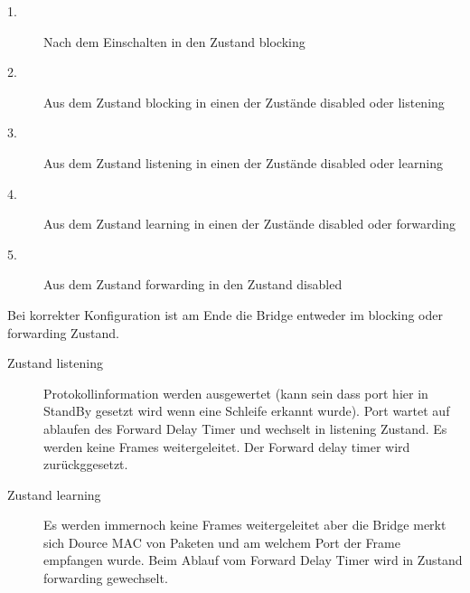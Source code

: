 \documentclass[a4paper,10pt]{scrartcl}
\begin{document}
            \begin{description}
                \item[1.] Nach dem Einschalten in den Zustand blocking
                \item[2.] Aus dem Zustand blocking in einen der Zustände disabled oder listening
                \item[3.] Aus dem Zustand listening in einen der Zustände disabled oder learning
                \item[4.] Aus dem Zustand learning in einen der Zustände disabled oder forwarding
                \item[5.] Aus dem Zustand forwarding in den Zustand disabled
            \end{description} 
            Bei korrekter Konfiguration ist am Ende die Bridge entweder im blocking oder forwarding Zustand.

            \begin{description}
                \item[Zustand listening]
                Protokollinformation werden ausgewertet (kann sein dass port hier in StandBy gesetzt wird wenn eine Schleife erkannt wurde).
                Port wartet auf ablaufen des Forward Delay Timer und wechselt in listening Zustand. Es werden keine Frames weitergeleitet.
                Der Forward delay timer wird zurückggesetzt.
                \item[Zustand learning]
                Es werden immernoch keine Frames weitergeleitet aber die Bridge merkt sich Dource MAC von Paketen und am welchem Port der Frame empfangen wurde.
                Beim Ablauf vom Forward Delay Timer wird in Zustand forwarding gewechselt.
            \end{description}
\end{document}
